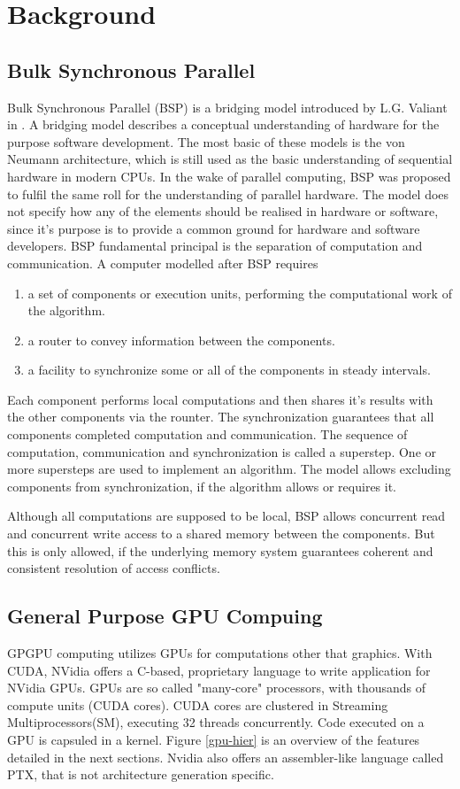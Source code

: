 \chapter{Background}
\section{Bulk Synchronous Parallel} \label{sec:bsp}
Bulk Synchronous Parallel (BSP) is a bridging model introduced by L.G. Valiant in \cite{Valiant:1990:BMP:79173.79181}. A bridging model describes a conceptual understanding of
hardware for the purpose software development. The most basic of these models is the von Neumann architecture, which is still used as the basic understanding of sequential hardware in modern CPUs. In the wake of parallel computing, BSP was proposed to fulfil the same roll
for the understanding of parallel hardware. The model does not specify how any of the elements should be realised in hardware or software, since it's purpose is to provide a common ground for hardware and software developers. 
BSP fundamental principal is the separation of computation and communication. A computer modelled after BSP requires
\begin{enumerate}
	\item a set of components or execution units, performing the computational work of the algorithm.
	\item a router to convey information between the components.
	\item a facility to synchronize some or all of the components in steady intervals.
\end{enumerate}
Each component performs local computations and then shares it's results with
the other components via the rounter. The synchronization guarantees that all components completed computation and communication. The sequence of computation, communication and synchronization is called a superstep. One or more supersteps are used to implement an algorithm.
The model allows excluding components from synchronization, if the algorithm allows or requires it.

Although all computations are supposed to be local, BSP allows concurrent read and concurrent write access to a shared memory between the
components. But this is only allowed, if the underlying memory system guarantees coherent and consistent resolution of access conflicts.

\section{General Purpose GPU Compuing}
GPGPU computing utilizes GPUs for computations other that graphics. With CUDA, NVidia offers a C-based, proprietary language to write application for NVidia GPUs. GPUs are so called "many-core" processors, with thousands of compute units (CUDA cores). CUDA cores are clustered in Streaming Multiprocessors(SM), executing 32 threads concurrently. Code executed on a GPU is capsuled in a kernel. Figure \ref{gpu-hier} is an overview of the features detailed in the next sections. Nvidia also offers an assembler-like language called PTX, that is not architecture generation specific. \cite[4.1-4.2	]{cuda-man}

